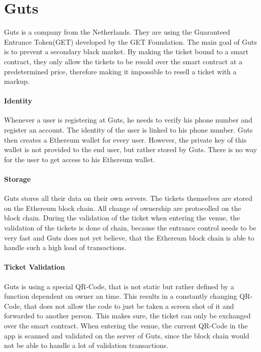 
\section{Guts}
Guts \cite{GET_PROTOCOL} is a company from the Netherlands. They are using the Guaranteed Entrance Token(GET) developed by the GET Foundation. The main goal of Guts is to prevent a secondary black market. By making the ticket bound to a smart contract, they only allow the tickets to be resold over the smart contract at a predetermined price, therefore making it impossible to resell a ticket with a markup.

\paragraph{Identity}
Whenever a user is registering at Guts, he needs to verify his phone number and register an account. The identity of the user is linked to his phone number. Guts then creates a Ethereum wallet for every user. However, the private key of this wallet is not provided to the end user, but rather stored by Guts. There is no way for the user to get access to his Ethereum wallet. 


\paragraph{Storage}
Guts stores all their data on their own servers. The tickets themselves are stored on the Ethereum block chain. All change of ownership are protocolled on the block chain. During the validation of the ticket when entering the venue, the validation of the tickets is done of chain, because the entrance control needs to be very fast and Guts does not yet believe, that the Ethereum block chain is able to handle such a high load of transactions.

\paragraph{Ticket Validation}
Guts is using a special QR-Code, that is not static but rather defined by a function dependent on owner an time. This results in a constantly changing QR-Code, that does not allow the code to just be taken a screen shot of it and forwarded to another person. This makes sure, the ticket can only be exchanged over the smart contract. When entering the venue, the current QR-Code in the app is scanned and validated on the server of Guts, since the block chain would not be able to handle a lot of validation transactions.


